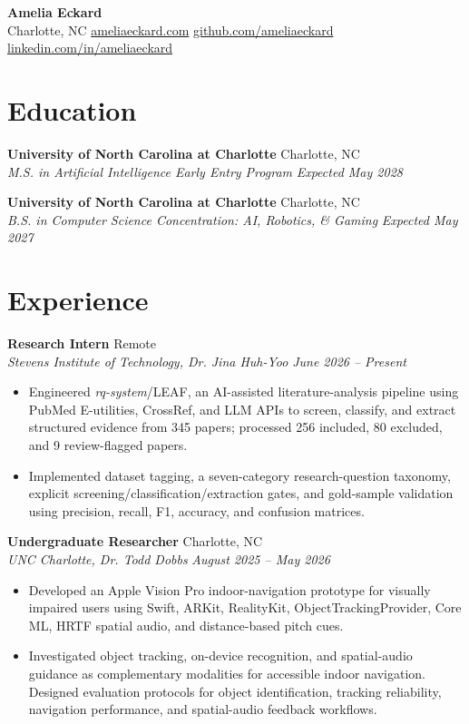 \documentclass[letterpaper,10pt]{article}
\newcommand{\resumeentry}[4]{
  \noindent\textbf{#1} \hfill #2 \\
  \textit{#3} \hfill \textit{#4}
}
\begin{document}
\begin{center}
  {\Large\textbf{Amelia Eckard}} \\[3pt]
  Charlotte, NC \textbar{}
  \href{https://ameliaeckard.com}{ameliaeckard.com} \textbar{}
  \href{https://github.com/ameliaeckard}{github.com/ameliaeckard} \textbar{}
  \href{https://linkedin.com/in/ameliaeckard}{linkedin.com/in/ameliaeckard}
\end{center}

\section{Education}

\resumeentry
  {University of North Carolina at Charlotte}{Charlotte, NC}
  {M.S. in Artificial Intelligence \textbar{} Early Entry Program}{Expected May 2028}

\smallskip

\resumeentry
  {University of North Carolina at Charlotte}{Charlotte, NC}
  {B.S. in Computer Science \textbar{} Concentration: AI, Robotics, \& Gaming}{Expected May 2027}

\section{Experience}

\resumeentry
  {Research Intern}{Remote}
  {Stevens Institute of Technology, Dr. Jina Huh-Yoo}{June 2026 -- Present}
\begin{itemize}
  \item Engineered \textit{rq-system}/LEAF, an AI-assisted literature-analysis pipeline using PubMed E-utilities, CrossRef, and LLM APIs to screen, classify, and extract structured evidence from 345 papers; processed 256 included, 80 excluded, and 9 review-flagged papers.
  \item Implemented dataset tagging, a seven-category research-question taxonomy, explicit screening/classification/extraction gates, and gold-sample validation using precision, recall, F1, accuracy, and confusion matrices.
\end{itemize}

\smallskip

\resumeentry
  {Undergraduate Researcher}{Charlotte, NC}
  {UNC Charlotte, Dr. Todd Dobbs}{August 2025 -- May 2026}
\begin{itemize}
  \item Developed an Apple Vision Pro indoor-navigation prototype for visually impaired users using Swift, ARKit, RealityKit, ObjectTrackingProvider, Core ML, HRTF spatial audio, and distance-based pitch cues.
  \item Investigated object tracking, on-device recognition, and spatial-audio guidance as complementary modalities for accessible indoor navigation. Designed evaluation protocols for object identification, tracking reliability, navigation performance, and spatial-audio feedback workflows.
\end{itemize}
\end{document}
